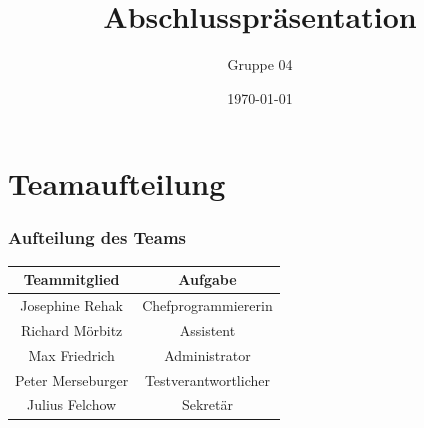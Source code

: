 \documentclass{beamer}
\title{Abschlusspräsentation}
\author{Gruppe 04}
\date{\today}
\begin{document}
	\maketitle
	\frame{\tableofcontents[]}
	\section{Teamaufteilung}
	\begin{frame}
		\frametitle{Aufteilung des Teams}
		\begin{center}			
			\begin{tabular}{c|c}
				Teammitglied & Aufgabe \\\hline
				Josephine Rehak & Chefprogrammiererin\\
				Richard Mörbitz & Assistent\\
				Max Friedrich & Administrator\\
				Peter Merseburger & Testverantwortlicher\\
				Julius Felchow & Sekretär\\
			\end{tabular}
		\end{center}
	\end{frame}
	
\end{document}
